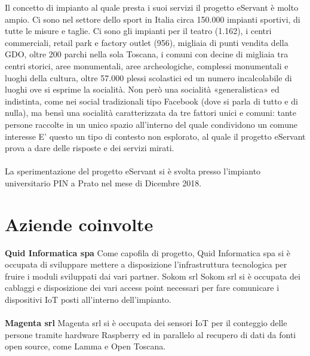 Il concetto di impianto al quale presta i suoi servizi il progetto eServant è molto ampio.
Ci sono nel settore dello sport in Italia circa 150.000 impianti sportivi, di tutte le misure e taglie. Ci sono gli impianti per il teatro (1.162), i centri commerciali, retail park e factory outlet (956), migliaia di punti vendita della GDO, oltre 200 parchi nella sola Toscana, i comuni con decine di migliaia tra centri storici, aree monumentali, aree archeologiche, complessi monumentali e luoghi della cultura, oltre 57.000 plessi scolastici ed un numero incalcolabile di luoghi ove si esprime la socialità.
Non però una socialità «generalistica» ed indistinta, come nei social tradizionali tipo Facebook (dove si parla di tutto e di nulla), ma bensì una socialità caratterizzata da tre fattori unici e comuni:
tante persone
raccolte in un unico spazio
all’interno del quale condividono un comune interesse
E’ questo un tipo di contesto non esplorato, al quale il progetto eServant prova a dare delle risposte e dei servizi mirati.
\paragraph{}

La sperimentazione del progetto eServant si è svolta presso l’impianto universitario PIN a Prato nel mese di Dicembre 2018.
\paragraph{}

\section{Aziende coinvolte}

\textbf{Quid Informatica spa}
Come capofila di progetto, Quid Informatica spa si è occupata di sviluppare mettere a disposizione l’infrastruttura tecnologica per fruire i moduli sviluppati dai vari partner.
Sokom srl
Sokom srl si è occupata dei cablaggi e disposizione dei vari access point necessari per fare comunicare i dispositivi IoT posti all’interno dell’impianto.
\paragraph{}

\textbf{Magenta srl}
Magenta srl si è occupata dei sensori IoT per il conteggio delle persone tramite hardware Raspberry ed in parallelo al recupero di dati da fonti open source, come Lamma e Open Toscana.
